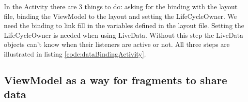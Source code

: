 In the Activity there are 3 things to do: asking for the binding with the layout file, binding the ViewModel to the layout and setting the LifeCycleOwner.
We need the binding to link fill in the variables defined in the layout file. 
Setting the LifeCycleOwner is needed when using LiveData. 
Without this step the LiveData objects can't know when their listeners are active or not.
All three steps are illustrated in listing \ref{code:dataBindingActivity}.




\subsection{ViewModel as a way for fragments to share data}
